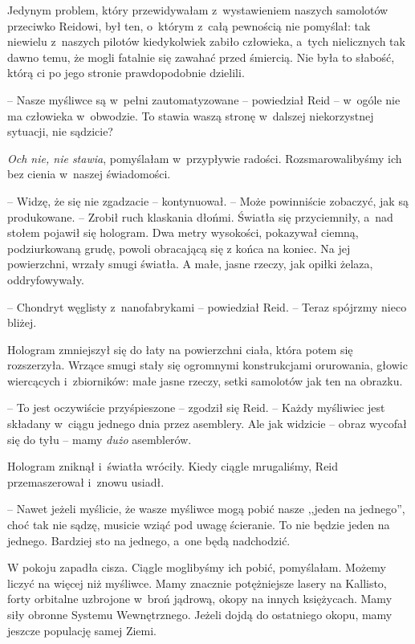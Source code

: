 \documentclass[oneside,polish,11pt,sfheadings]{mwbk}
\begin{document}
Jedynym problem, który przewidywałam z~wystawieniem naszych samolotów
przeciwko Reidowi, był ten, o~którym z~całą pewnością nie pomyślał: tak
niewielu z~naszych pilotów kiedykolwiek zabiło człowieka, a~tych
nielicznych tak dawno temu, że mogli fatalnie się zawahać przed
śmiercią. Nie była to słabość, którą ci po jego stronie prawdopodobnie
dzielili.

-- Nasze myśliwce są w~pełni zautomatyzowane -- powiedział Reid -- w~ogóle
nie ma człowieka w~obwodzie. To stawia waszą stronę w~dalszej
niekorzystnej sytuacji, nie sądzicie?

\textit{Och nie, nie stawia}, pomyślałam w~przypływie radości.
Rozsmarowalibyśmy ich bez cienia w~naszej świadomości.

-- Widzę, że się nie zgadzacie -- kontynuował. -- Może powinniście
zobaczyć, jak są produkowane. -- Zrobił ruch klaskania dłońmi. Światła
się przyciemniły, a~nad stołem pojawił się hologram. Dwa metry
wysokości, pokazywał ciemną, podziurkowaną grudę, powoli obracającą się
z końca na koniec. Na jej powierzchni, wrzały smugi światła. A małe,
jasne rzeczy, jak opiłki żelaza, oddryfowywały.

-- Chondryt węglisty z~nanofabrykami -- powiedział Reid. -- Teraz spójrzmy
nieco bliżej. 

Hologram zmniejszył się do łaty na powierzchni ciała,
która potem się rozszerzyła. Wrzące smugi stały się ogromnymi
konstrukcjami orurowania, głowic wiercących i~zbiorników: małe jasne
rzeczy, setki samolotów jak ten na obrazku.

-- To jest oczywiście przyśpieszone -- zgodził się Reid. -- Każdy myśliwiec
jest składany w~ciągu jednego dnia przez asemblery. Ale jak widzicie -- obraz wycofał się do tyłu -- mamy \textit{dużo} asemblerów.

Hologram zniknął i~światła wróciły. Kiedy ciągle mrugaliśmy, Reid
przemaszerował i~znowu usiadł.

-- Nawet jeżeli myślicie, że wasze myśliwce mogą pobić nasze ,,jeden na
jednego'', choć tak nie sądzę, musicie wziąć pod uwagę ścieranie. To nie
będzie jeden na jednego. Bardziej sto na jednego, a~one będą nadchodzić.

W pokoju zapadła cisza. Ciągle moglibyśmy ich pobić, pomyślałam. Możemy
liczyć na więcej niż myśliwce. Mamy znacznie potężniejsze lasery na
Kallisto, forty orbitalne uzbrojone w~broń jądrową, okopy na innych
księżycach. Mamy siły obronne Systemu Wewnętrznego. Jeżeli dojdą do
ostatniego okopu, mamy jeszcze populację samej Ziemi.
\end{document}
